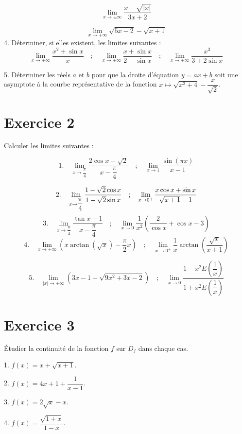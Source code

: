 \documentclass[12pt]{article}
\begin{document}
\[
\lim_{x \to \pm \infty} \dfrac{x - \sqrt{|x|}}{3x + 2}
\]

\[
\lim_{x \to +\infty} \sqrt{5x-2}-\sqrt{x+1}
\]
4. Déterminer, si elles existent, les limites suivantes :
\[
\lim_{x \to \pm \infty} \dfrac{x^2 + \sin x}{x} \quad ; \quad \lim_{x \to \pm\infty} \dfrac{x + \sin x}{2 - \sin x} \quad ; \quad \lim_{x \to \pm \infty} \dfrac{x^3}{3 + 2 \sin x}
\]

5. Déterminer les réels \( a \) et \( b \) pour que la droite d'équation \( y = ax + b \) soit une asymptote à la courbe représentative de la fonction \( x \mapsto \sqrt{x^2 + 4} - \dfrac{x}{\sqrt{2}} \).

\section*{Exercice 2}

Calculer les limites suivantes :

\[
1. \quad \lim_{x \to \dfrac{\pi}{4}} \dfrac{2 \cos x - \sqrt{2}}{x - \dfrac{\pi}{4}} \quad ; \quad \lim_{x \to 1} \dfrac{\sin(\pi x)}{x - 1}
\]

\[
2. \quad \lim_{x \to \dfrac{\pi}{4}} \frac{1 - \sqrt{2} \cos x}{1 - \sqrt{2} \sin x} \quad ; \quad \lim_{x \to 0^+} \dfrac{x \cos x + \sin x}{\sqrt{x + 1} - 1} \\
\]
\[
3. \quad \lim_{x \to \dfrac{\pi}{4}} \dfrac{\tan x - 1}{x - \dfrac{\pi}{4}} \quad ; \quad \lim_{x \to 0} \dfrac{1}{x^2} \left( \dfrac{2}{\cos x }+ \cos x - 3 \right)
\]
\[
4. \quad \lim_{x \to +\infty} \left( x \arctan (\sqrt{x}) - \dfrac{\pi}{2} x \right) \quad ; \quad \lim_{x \to 0^+} \dfrac{1}{x} \arctan \left( \dfrac{\sqrt{x}}{x + 1} \right)
\]

\[
5. \quad \lim_{|x| \to +\infty} \left( 3x - 1 + \sqrt{9x^2 + 3x - 2} \right) \quad ; \quad \lim_{x \to 0} \dfrac{1 - x^2 E \left( \dfrac{1}{x} \right)}{1 + x^2 E \left( \dfrac{1}{x} \right)} 
\]

\section*{Exercice 3}

Étudier la continuité de la fonction $f$ sur $D_f$ dans chaque cas.

1. $f(x) = x + \sqrt{x+1}$.

2. $f(x) = 4x + 1 + \dfrac{1}{x - 1}$.

3. $f(x) = 2\sqrt{x} - x$.

4. $f(x) = \dfrac{\sqrt{1 + x}}{1 - x}$.
\end{document}
